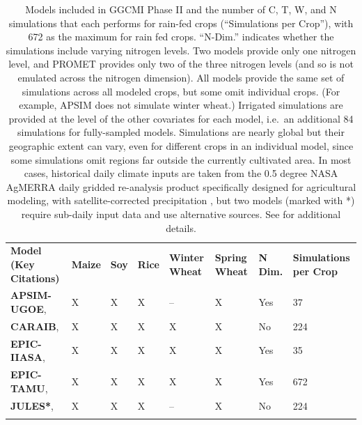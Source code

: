 \documentclass[esd, final]{copernicus} %
\begin{document}
\begin{table}[t]
 \caption{Models included in GGCMI Phase II and the number of C, T, W, and N simulations that each performs for rain-fed crops (``Simulations per Crop''), with 672 as the maximum for rain fed crops. ``N-Dim.'' indicates whether the simulations include varying nitrogen levels. Two models provide only one nitrogen level, and \dag PROMET provides only two of the three nitrogen levels (and so is not emulated across the nitrogen dimension). All models provide the same set of simulations across all modeled crops, but some omit individual crops. (For example, APSIM does not simulate winter wheat.) Irrigated simulations are provided at the level of the other covariates for each model, i.e.\ an additional 84 simulations for fully-sampled models. Simulations are nearly global but their geographic extent can vary, even for different crops in an individual model, since some simulations omit regions far outside the currently cultivated area. In most cases, historical daily climate inputs are taken from the 0.5 degree NASA AgMERRA daily gridded re-analysis product specifically designed for agricultural modeling, with satellite-corrected precipitation \citep{Ruane2015}, but two models (marked with *) require sub-daily input data and use alternative sources. See \citet{Elliott2015} for additional details.} 
\label{table:models}
	\begin{tabular}{p{6cm} p{1cm} p{1cm} p{1cm} p{1cm} p{1cm} p{1cm} p{1.5cm}}
        \tophline
        \textbf{Model (Key Citations)} & \textbf{Maize} & \textbf{Soy} & \textbf{Rice} & \textbf{Winter Wheat} & \textbf{Spring Wheat} & \textbf{N Dim.} & \textbf{Simulations per Crop}\\ \middlehline
        {\textbf{APSIM-UGOE},    \citet{KEATING2003267, HOLZWORTH2014327}} & {X} & {X} & {X} & {--} & {X} & {Yes} & {37}\\ \middlehline
        {\textbf{CARAIB},        \citet{Dury2011, Pirttioja2015}} & {X} & {X} & {X} & {X} & {X} & {No} & {224}\\ \middlehline
        {\textbf{EPIC-IIASA},    \citet{BALKOVIC2014}} & {X} & {X} & {X} & {X} & {X} & {Yes} & {35}\\  \middlehline
        {\textbf{EPIC-TAMU},     \citet{Izaurralde06}} & {X} & {X} & {X} & {X} & {X} & {Yes} & {672}\\ \middlehline
        {\textbf{JULES*},        \citet{Osborne2015, Williams2015, Williams2017}} & {X} & {X} & {X} & {--} & {X} & {No} & {224}\\ \middlehline

\end{tabular}
\end{table}
\end{document}
